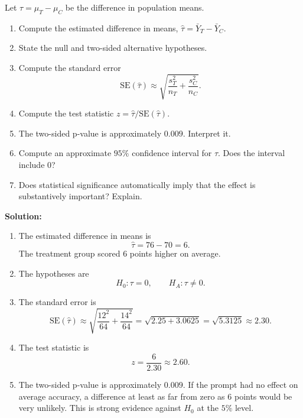 \documentclass[12pt]{article}
\newif\ifsolutions
\begin{document}
\begin{enumerate}
    Let \(\tau = \mu_T - \mu_C\) be the difference in population means.

    \begin{enumerate}[label=(\alph*)]
        \item Compute the estimated difference in means, \(\widehat{\tau} = \bar{Y}_T - \bar{Y}_C\).
        \item State the null and two-sided alternative hypotheses.
        \item Compute the standard error
        \[
            \mathrm{SE}(\widehat{\tau}) \approx \sqrt{\frac{s_T^2}{n_T} + \frac{s_C^2}{n_C}}.
        \]
        \item Compute the test statistic \(z = \widehat{\tau}/\mathrm{SE}(\widehat{\tau})\).
        \item The two-sided p-value is approximately \(0.009\). Interpret it.
        \item Compute an approximate \(95\%\) confidence interval for \(\tau\). Does the interval include \(0\)?
        \item Does statistical significance automatically imply that the effect is substantively important? Explain.
    \end{enumerate}

    \ifsolutions \color{blue} \textbf{Solution:} \\
    \begin{enumerate}[label=(\alph*)]
        \item The estimated difference in means is
        \[
            \widehat{\tau} = 76 - 70 = 6.
        \]
        The treatment group scored \(6\) points higher on average.

        \item The hypotheses are
        \[
            H_0: \tau = 0, \qquad H_A: \tau \neq 0.
        \]

        \item The standard error is
        \[
            \mathrm{SE}(\widehat{\tau}) \approx \sqrt{\frac{12^2}{64} + \frac{14^2}{64}}
            = \sqrt{2.25 + 3.0625}
            = \sqrt{5.3125}
            \approx 2.30.
        \]

        \item The test statistic is
        \[
            z = \frac{6}{2.30} \approx 2.60.
        \]

        \item The two-sided p-value is approximately \(0.009\). If the prompt had no effect on average accuracy, a difference at least as far from zero as \(6\) points would be very unlikely. This is strong evidence against \(H_0\) at the \(5\%\) level.


\end{enumerate}
\end{enumerate}
\end{document}
